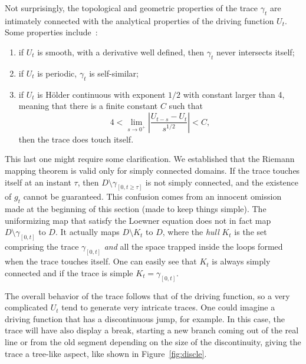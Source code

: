 Not surprisingly, the topological and geometric properties of the trace
$\gamma_t$ are intimately connected with the analytical properties of the
driving function $U_t$. Some properties include~\cite{Gruzberg2004}:
\begin{enumerate}
    \item if $U_t$ is smooth, with a derivative well defined, then $\gamma_t$
        never intersects itself;
    \item if $U_t$ is periodic, $\gamma_t$ is self-similar;
    \item if $U_t$ is H\"older continuous with exponent $1/2$ with constant
        larger than 4, meaning that there is a finite constant $C$ such that
        \begin{equation}
            \label{eq:holder}
            4<\lim_{s\rightarrow0^{+}}\left|
                \frac{U_{t-s}-U_{t}}{s^{1/2}}\right|
            <C,
        \end{equation}
        then the trace does touch itself.
\end{enumerate}
This last one might require some clarification. We established that the Riemann
mapping theorem is valid only for simply connected domains. If the trace touches
itself at an instant $\tau$, then $D\setminus\gamma_{[0,t\geq\tau]}$ is not
simply connected, and the existence of $g_t$ cannot be guaranteed. This
confusion comes from an innocent omission made at the beginning of this
section (made to keep things simple). The uniformizing map that satisfy the
Loewner equation does not in fact map $D\setminus\gamma_{[0,t]}$ to $D$. It
actually maps $D\setminus K_t$ to $D$, where the \textit{hull} $K_t$ is the set
comprising the trace $\gamma_{[0,t]}$ \textit{and} all the space trapped inside
the loops formed when the trace touches itself. One can easily see that $K_t$
is always simply connected and if the trace is simple $K_t = \gamma_{[0,t]}$.

The overall behavior of the trace follows that of the driving function, so a
very complicated $U_t$ tend to generate very intricate traces. One could
imagine a driving function that has a discontinuous jump, for example. In this
case, the trace will have also display a break, starting a new branch coming
out of the real line or from the old segment depending on the size of the
discontinuity, giving the trace a tree-like aspect, like shown in
Figure~\ref{fig:discle}.


